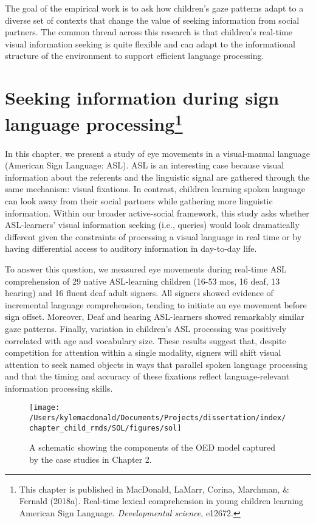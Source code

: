 \documentclass[oneside]{report}
\begin{document}
The goal of the empirical work is to ask how children's gaze patterns
adapt to a diverse set of contexts that change the value of seeking
information from social partners. The common thread across this research
is that children's real-time visual information seeking is quite
flexible and can adapt to the informational structure of the environment
to support efficient language processing.

\chapter[Seeking information during sign language
processing]{\texorpdfstring{Seeking information during sign language
processing\footnote{This chapter is published in MacDonald, LaMarr,
  Corina, Marchman, \& Fernald (2018a). Real-time lexical comprehension
  in young children learning American Sign Language. \emph{Developmental
  science}, e12672.}}{Seeking information during sign language processing}}\label{seeking-information-during-sign-language-processing}

In this chapter, we present a study of eye movements in a visual-manual
language (American Sign Language: ASL). ASL is an interesting case
because visual information about the referents and the linguistic signal
are gathered through the same mechanism: visual fixations. In contrast,
children learning spoken language can look away from their social
partners while gathering more linguistic information. Within our broader
active-social framework, this study asks whether ASL-learners' visual
information seeking (i.e., queries) would look dramatically different
given the constraints of processing a visual language in real time or by
having differential access to auditory information in day-to-day life.

To answer this question, we measured eye movements during real-time ASL
comprehension of 29 native ASL-learning children (16-53 mos, 16 deaf, 13
hearing) and 16 fluent deaf adult signers. All signers showed evidence
of incremental language comprehension, tending to initiate an eye
movement before sign offset. Moreover, Deaf and hearing ASL-learners
showed remarkably similar gaze patterns. Finally, variation in
children's ASL processing was positively correlated with age and
vocabulary size. These results suggest that, despite competition for
attention within a single modality, signers will shift visual attention
to seek named objects in ways that parallel spoken language processing
and that the timing and accuracy of these fixations reflect
language-relevant information processing skills.
\begin{figure}[!t]

{\centering \texttt{[image: /Users/kylemacdonald/Documents/Projects/dissertation/index/chapter\_child\_rmds/SOL/figures/sol]} 

}

\caption[Overview of Chapter 2.]{A schematic showing the components of the OED model captured by the case studies in Chapter 2.}\label{fig:schematic-sol}
\end{figure}
\end{document}
